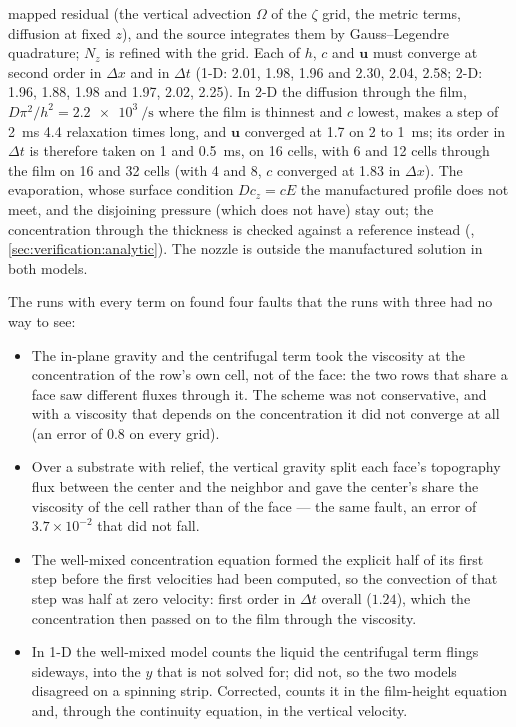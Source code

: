 mapped residual (the vertical advection $\Omega$ of the $\zeta$ grid, the
metric terms, diffusion at fixed $z$), and the source integrates them by
Gauss--Legendre quadrature; $N_z$ is refined with the grid. Each of $h$, $c$
and $\mathbf u$ must converge at second order in $\Delta x$ and in $\Delta t$
(1-D: 2.01, 1.98, 1.96 and 2.30, 2.04, 2.58; 2-D: 1.96, 1.88, 1.98 and
1.97, 2.02, 2.25). In 2-D the diffusion through the film,
$D\pi^2/h^2 = \SI{2.2e3}{\per\second}$ where the film is thinnest and $c$
lowest, makes a step of \SI{2}{\milli\second} 4.4 relaxation times long, and $\mathbf u$
converged at 1.7 on 2 to \SI{1}{\milli\second}; its order in $\Delta t$ is
therefore taken on 1 and \SI{0.5}{\milli\second}, on 16 cells, with 6 and 12
cells through the film on 16 and 32 cells (with 4 and 8, $c$ converged at
1.83 in $\Delta x$). The evaporation, whose surface condition $D c_z = cE$ the
manufactured profile does not meet, and the disjoining pressure (which
 does not have) stay out; the concentration through the
thickness is checked against a reference instead (,
\cref{sec:verification:analytic}). The nozzle is outside the manufactured
solution in both models.

The runs with every term on found four faults that the runs with three had
no way to see:
\begin{itemize}
  \item The in-plane gravity and the centrifugal term took the viscosity at
    the concentration of the row's own cell, not of the face: the two rows
    that share a face saw different fluxes through it. The scheme was not
    conservative, and with a viscosity that depends on the concentration it
    did not converge at all (an error of 0.8 on every grid).
  \item Over a substrate with relief, the vertical gravity split each face's
    topography flux between the center and the neighbor and gave the
    center's share the viscosity of the cell rather than of the face ---
    the same fault, an error of $3.7\times10^{-2}$ that did not fall.
  \item The well-mixed concentration equation formed the explicit half of
    its first step before the first velocities had been computed, so the
    convection of that step was half at zero velocity: first order in
    $\Delta t$ overall ($1.24$), which the concentration then passed on to
    the film through the viscosity.
  \item In 1-D the well-mixed model counts the liquid the centrifugal term
    flings sideways, into the $y$ that is not solved for;  did
    not, so the two models disagreed on a spinning strip. Corrected,
     counts it in the film-height equation and, through the continuity
    equation, in the vertical velocity.
\end{itemize}

